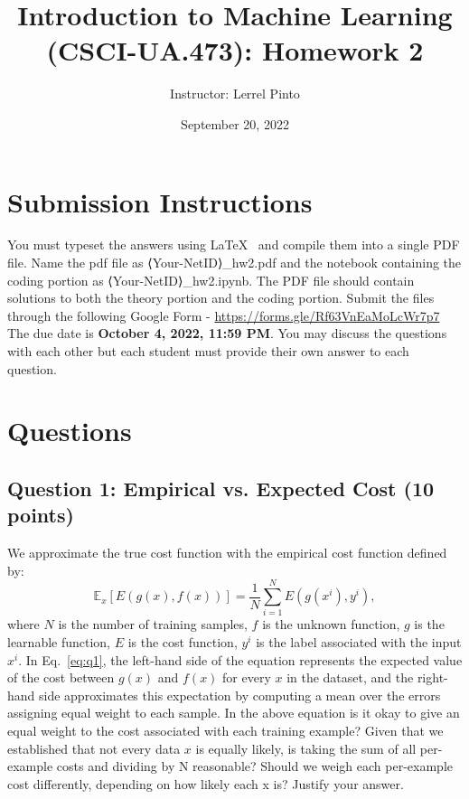 \documentclass{article}
\title{Introduction to Machine Learning
(CSCI-UA.473): Homework 2}
\author{Instructor: Lerrel Pinto}
\date{September 20, 2022}
\begin{document}
\maketitle

\section*{Submission Instructions}
You must typeset the answers  
using \LaTeX~ and compile them into a 
single PDF file. 
Name the pdf file as 
⟨Your-NetID⟩\_hw2.pdf and the notebook containing the coding portion as  ⟨Your-NetID⟩\_hw2.ipynb. The PDF file should contain solutions to both the theory portion and the coding portion. Submit the files through the following Google Form - \href{https://forms.gle/Rf63VnEaMoLcWr7p7}{https://forms.gle/Rf63VnEaMoLcWr7p7} 
The due date is 
{\bf October 4, 2022, 11:59 PM}. You may discuss the questions with each other but each student must provide their own answer to each question.

\section*{Questions}

\subsection*{Question 1: 
Empirical vs. Expected Cost (10 points)} 
We approximate the true cost 
function with the empirical 
cost function defined by: 
\begin{equation}
\mathbb{E}_{x}\left[E(g(x), f(x))\right] = 
\frac{1}{N} \sum_{i=1}^N E(g(x^i), y^i),
\label{eq:q1}
\end{equation}
where $N$ is the number of training samples, $f$ is the unknown function, $g$ is the learnable function, $E$ is the cost function, $y^i$ is the label associated with the input $x^i$. In Eq.~\ref{eq:q1}, the left-hand side of the equation represents the expected value of the cost between $g(x)$ and $f(x)$ for every $x$ in the dataset, and the right-hand side approximates this expectation by computing a mean over the errors assigning equal weight to each sample. In the above equation is it okay to give an equal weight to the cost associated with each training example? 
Given that we established that not every data $x$ is
equally likely, is taking the sum of all per-example
costs and dividing by N reasonable? Should we weigh
each per-example cost differently, depending on 
how likely each x is? Justify your answer.
\end{document}
